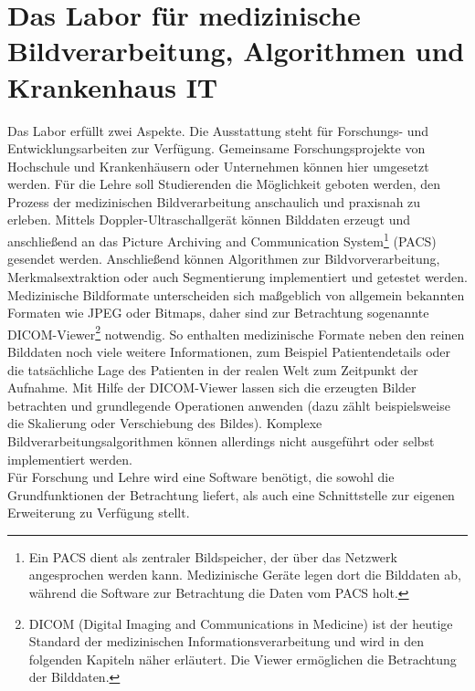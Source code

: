 \FloatBarrier
\section{Das Labor für medizinische Bildverarbeitung, Algorithmen und Krankenhaus IT}\label{einleitung:labor}
Das Labor erfüllt zwei Aspekte. Die Ausstattung steht für Forschungs- und Entwicklungsarbeiten zur Verfügung. Gemeinsame Forschungsprojekte von Hochschule und Krankenhäusern oder Unternehmen können hier umgesetzt werden.
Für die Lehre soll Studierenden die Möglichkeit geboten werden, den Prozess der medizinischen Bildverarbeitung anschaulich und praxisnah zu erleben. Mittels Doppler-Ultraschallgerät können Bilddaten erzeugt und anschließend an das Picture Archiving and Communication System\footnote{Ein PACS dient als zentraler Bildspeicher, der über das Netzwerk angesprochen werden kann. Medizinische Geräte legen dort die Bilddaten ab, während die Software zur Betrachtung die Daten vom PACS holt.} (PACS) gesendet werden. Anschließend können Algorithmen zur Bildvorverarbeitung, Merkmalsextraktion oder auch Segmentierung implementiert und getestet werden.\\
Medizinische Bildformate unterscheiden sich maßgeblich von allgemein bekannten Formaten wie JPEG oder Bitmaps, daher sind zur Betrachtung sogenannte DICOM-Viewer\footnote{DICOM (Digital Imaging and Communications in Medicine) ist der heutige Standard der medizinischen Informationsverarbeitung und wird in den folgenden Kapiteln näher erläutert. Die Viewer ermöglichen die Betrachtung der Bilddaten.} notwendig. So enthalten medizinische Formate neben den reinen Bilddaten noch viele weitere Informationen, zum Beispiel Patientendetails oder die tatsächliche Lage des Patienten in der realen Welt zum Zeitpunkt der Aufnahme.
Mit Hilfe der DICOM-Viewer lassen sich die erzeugten Bilder betrachten und grundlegende Operationen anwenden (dazu zählt beispielsweise die Skalierung oder Verschiebung des Bildes). Komplexe Bildverarbeitungsalgorithmen können allerdings nicht ausgeführt oder selbst implementiert werden.\\
Für Forschung und Lehre wird eine Software benötigt, die sowohl die Grundfunktionen der Betrachtung liefert, als auch eine Schnittstelle zur eigenen Erweiterung zu Verfügung stellt.

